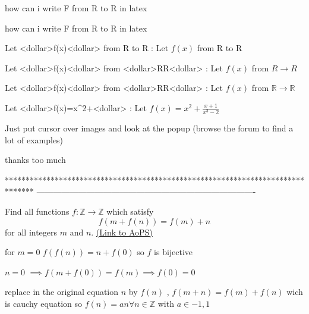 \begin{solution}
	how can i write F from R to R in latex
\end{solution}



\begin{solution}
	\begin{tcolorbox}how can i write F from R to R in latex\end{tcolorbox}

Let <dollar>f(x)<dollar> from R to R :  
Let $ f(x)$ from R to R  

Let <dollar>f(x)<dollar> from <dollar>R\to R<dollar> : 
Let $ f(x)$ from $ R\to R$

Let <dollar>f(x)<dollar> from <dollar>\mathbb R\to\mathbb R<dollar> : 
Let $ f(x)$ from $ \mathbb R\to\mathbb R$

Let <dollar>f(x)=x^2+<dollar> :
Let $ f(x)=x^2+\frac{x+1}{x^3-2}$

Just put cursor over images and look at the popup (browse the forum to find a lot of examples)
\end{solution}



\begin{solution}
	thanks too much 
\end{solution}
*******************************************************************************
-------------------------------------------------------------------------------

\begin{problem}
	Find all functions $f: \mathbb Z \to \mathbb Z$ which satisfy \[f(m+ f(n)) = f(m) + n\] for all integers $m$ and $n$.
	\flushright \href{https://artofproblemsolving.com/community/c6h316414}{(Link to AoPS)}
\end{problem}



\begin{solution}
	for $ m = 0$  $ f(f(n)) = n + f(0)$ so $ f$ is bijective

$ n = 0$ $ \implies f(m + f(0)) = f(m) \implies f(0) = 0$

replace in the original equation $ n$ by $ f(n)$  , $ f(m + n) = f(m) + f(n)$
wich is cauchy equation so $ f(n) = an \forall n\in\mathbb{Z}$ with $ a\in { - 1,1}$
\end{solution}



